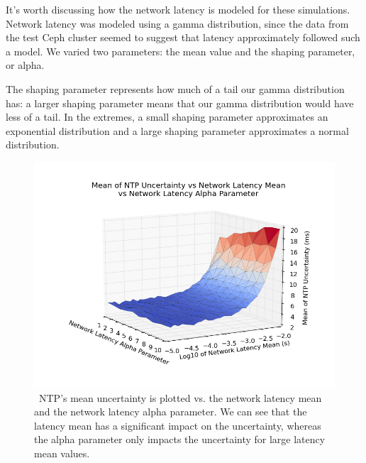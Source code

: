 It's worth discussing how the network latency is modeled for these
simulations. Network latency was modeled using a gamma distribution,
since the data from the test Ceph cluster seemed to suggest that
latency approximately followed such a model. We varied two parameters:
the mean value and the shaping parameter, or alpha.

The shaping parameter represents how much of a tail our gamma
distribution has: a larger shaping parameter means that our gamma
distribution would have less of a tail. In the extremes, a small
shaping parameter approximates an exponential distribution and a large
shaping parameter approximates a normal distribution.


\begin{figure}[!htbp]
  \caption{~NTP's mean uncertainty is plotted vs. the network latency mean and the network latency alpha parameter. We can see that the latency mean has a significant impact on the uncertainty, whereas the alpha parameter only impacts the uncertainty for large latency mean values.}
  \label{fig:mean-uncertainty_latency-mean_latency-alpha}
  \includegraphics[width=0.8\linewidth]{mean_max_error-mean_latency-latency_alpha.png}
\end{figure}



